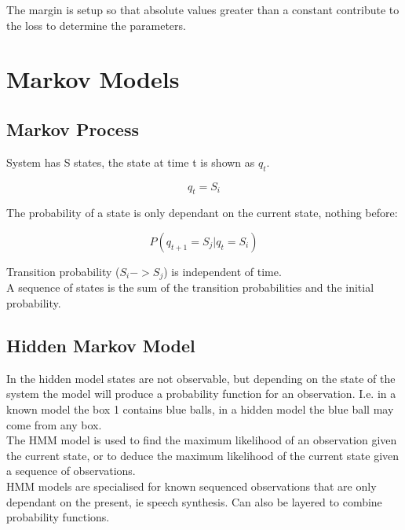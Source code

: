 \documentclass[11pt]{scrartcl} %
\begin{document}
The margin is setup so that absolute values greater than a constant contribute to the loss to determine
the parameters.\\

\section{Markov Models}

\subsection{Markov Process}

System has S states, the state at time t is shown as $q_t$.

\begin{equation}
	q_t = S_i
\end{equation}

The probability of a state is only dependant on the current state, nothing before:

\begin{equation}
	P(q_{t+1}=S_j|q_t = S_i)
\end{equation}

Transition probability ($S_i -> S_j$) is independent of time.\\

A sequence of states is the sum of the transition probabilities and the initial probability. 

\subsection{Hidden Markov Model}

In the hidden model states are not observable, but depending on the state of the system the model will produce
a probability function for an observation. I.e. in a known model the box 1 contains blue balls, in a hidden model
the blue ball may come from any box.\\

The HMM model is used to find the maximum likelihood of an observation given the current state, or to deduce
the maximum likelihood of the current state given a sequence of observations.\\

HMM models are specialised for known sequenced observations that are only dependant on the present, ie speech
synthesis. Can also be layered to combine probability functions.\\
\end{document}
